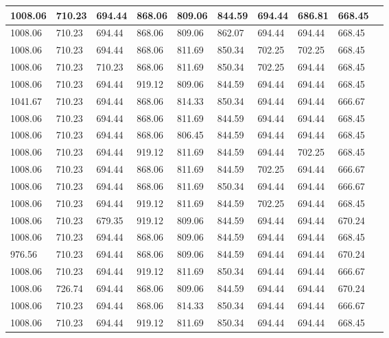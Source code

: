 \begin{longtable}{|l|l|l|l|l|l|l|l|l|l|}
		1008.06  & 710.23  & 694.44  & 868.06   & 809.06 & 844.59   & 694.44  & 686.81  & 668.45  \\ \hline
		1008.06  & 710.23  & 694.44  & 868.06   & 809.06 & 862.07   & 694.44  & 694.44  & 668.45  \\ \hline
		1008.06  & 710.23  & 694.44  & 868.06   & 811.69 & 850.34   & 702.25  & 702.25  & 668.45  \\ \hline
		1008.06  & 710.23  & 710.23  & 868.06   & 811.69 & 850.34   & 702.25  & 694.44  & 668.45  \\ \hline
		1008.06  & 710.23  & 694.44  & 919.12   & 809.06 & 844.59   & 694.44  & 694.44  & 668.45  \\ \hline
		1041.67  & 710.23  & 694.44  & 868.06   & 814.33 & 850.34   & 694.44  & 694.44  & 666.67  \\ \hline
		1008.06  & 710.23  & 694.44  & 868.06   & 811.69 & 844.59   & 694.44  & 694.44  & 668.45  \\ \hline
		1008.06  & 710.23  & 694.44  & 868.06   & 806.45 & 844.59   & 694.44  & 694.44  & 668.45  \\ \hline
		1008.06  & 710.23  & 694.44  & 919.12   & 811.69 & 844.59   & 694.44  & 702.25  & 668.45  \\ \hline
		1008.06  & 710.23  & 694.44  & 868.06   & 811.69 & 844.59   & 702.25  & 694.44  & 666.67  \\ \hline
		1008.06  & 710.23  & 694.44  & 868.06   & 811.69 & 850.34   & 694.44  & 694.44  & 666.67  \\ \hline
		1008.06  & 710.23  & 694.44  & 919.12   & 811.69 & 844.59   & 702.25  & 694.44  & 668.45  \\ \hline
		1008.06  & 710.23  & 679.35  & 919.12   & 809.06 & 844.59   & 694.44  & 694.44  & 670.24  \\ \hline
		1008.06  & 710.23  & 694.44  & 868.06   & 809.06 & 844.59   & 694.44  & 694.44  & 668.45  \\ \hline
		976.56   & 710.23  & 694.44  & 868.06   & 809.06 & 844.59   & 694.44  & 694.44  & 670.24  \\ \hline
		1008.06  & 710.23  & 694.44  & 919.12   & 811.69 & 850.34   & 694.44  & 694.44  & 666.67  \\ \hline
		1008.06  & 726.74  & 694.44  & 868.06   & 809.06 & 844.59   & 694.44  & 694.44  & 670.24  \\ \hline
		1008.06  & 710.23  & 694.44  & 868.06   & 814.33 & 850.34   & 694.44  & 694.44  & 666.67  \\ \hline
		1008.06  & 710.23  & 694.44  & 919.12   & 811.69 & 850.34   & 694.44  & 694.44  & 668.45  \\ \hline

\end{longtable}
